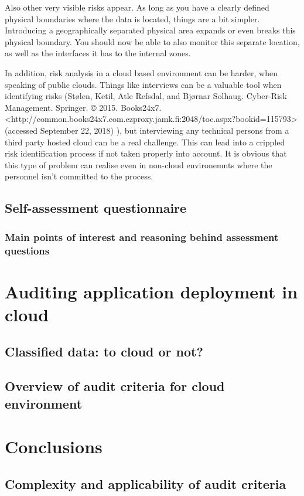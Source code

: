 \documentclass{article}
\begin{document}
\par
Also other very visible risks appear. As long as you have a clearly defined physical boundaries where the data is located, things are a bit simpler. Introducing a geographically separated physical area expands or even breaks this physical boundary. You should now be able to also monitor this separate location, as well as the interfaces it has to the internal zones. 
\par
In addition, risk analysis in a cloud based environment can be harder, when speaking of public clouds. Things like interviews can be a valuable tool when identifying risks (Stølen, Ketil, Atle Refsdal, and Bjørnar Solhaug. Cyber-Risk Management. Springer. © 2015. Books24x7. <http://common.books24x7.com.ezproxy.jamk.fi:2048/toc.aspx?bookid=115793> (accessed September 22, 2018) ), but interviewing any technical persons from a third party hosted cloud can be a real challenge. This can lead into a crippled risk identification process if not taken properly into account. It is obvious that this type of problem can realise even in non-cloud environemnts where the personnel isn't committed to the process.
\subsection{Self-assessment questionnaire}
\subsubsection{Main points of interest and reasoning behind assessment questions}
\section{Auditing application deployment in cloud}
\subsection{Classified data: to cloud or not?}
\subsection{Overview of audit criteria for cloud environment}
\section{Conclusions}
\subsection{Complexity and applicability of audit criteria}
\end{document}
